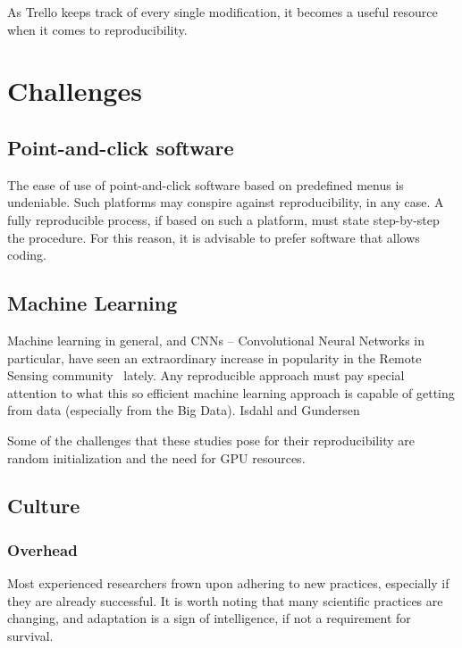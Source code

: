 \documentclass[journal,twoside]{IEEEtran}
\begin{document}
As Trello keeps track of every single modification, it becomes a useful resource when it comes to reproducibility.

\section{Challenges}\label{Sec:Challenges}

\subsection{Point-and-click software}

The ease of use of point-and-click software based on predefined menus is undeniable.
Such platforms may conspire against reproducibility, in any case.
A fully reproducible process, if based on such a platform, must state step-by-step the procedure.
For this reason, it is advisable to prefer software that allows coding.

\subsection{Machine Learning}

Machine learning in general, and CNNs -- Convolutional Neural Networks in particular, have seen an extraordinary increase in popularity in the Remote Sensing community~\cite{DeepLearningandProcessUnderstandingforDataDrivenEarthSystemScience} lately. 
Any reproducible approach must pay special attention to what this so efficient machine learning approach is capable of getting from data (especially from the Big Data).
Isdahl and Gundersen~\cite{OutoftheBoxReproducibilityaSurveyofMachineLearningPlatforms}

Some of the challenges that these studies pose for their reproducibility are random initialization and the need for GPU resources. 

\subsection{Culture}

\subsubsection{Overhead}

Most experienced researchers frown upon adhering to new practices, especially if they are already successful.
It is worth noting that many scientific practices are changing, and adaptation is a sign of intelligence, if not a requirement for survival.
\end{document}
